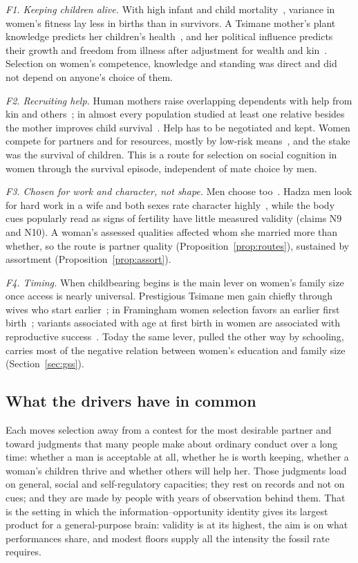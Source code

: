 \emph{F1. Keeping children alive.} With high infant and child mortality~\cite{volk2013}, variance in women's fitness lay less in
births than in survivors. A Tsimane mother's plant knowledge predicts her children's health~\cite{mcdade2007}, and her political
influence predicts their growth and freedom from illness after adjustment for wealth and kin~\cite{alami2020}. Selection on
women's competence, knowledge and standing was direct and did not depend on anyone's choice of them.

\emph{F2. Recruiting help.} Human mothers raise overlapping dependents with help from kin and
others~\cite{kramer2010,hawkes1998,burkart2014}; in almost every population studied at least one relative besides the mother
improves child survival~\cite{sear2008}. Help has to be negotiated and kept. Women compete for partners and for resources, mostly by
low-risk means~\cite{stockley2013}, and the stake was the survival of children. This is a route for selection on social
cognition in women through the survival episode, independent of mate choice by men.

\emph{F3. Chosen for work and character, not shape.} Men choose too~\cite{stewartwilliams2013}. Hadza men look for hard work in a
wife and both sexes rate character highly~\cite{marlowe2004}, while the body cues popularly read as signs of fertility have
little measured validity (claims N9 and N10). A woman's assessed qualities affected whom she married more than whether, so the
route is partner quality (Proposition~\ref{prop:routes}), sustained by assortment (Proposition~\ref{prop:assort}).

\emph{F4. Timing.} When childbearing begins is the main lever on women's family size once access is nearly universal.
Prestigious Tsimane men gain chiefly through wives who start earlier~\cite{vonrueden2011}; in Framingham women selection favors an
earlier first birth~\cite{byars2010}; variants associated with age at first birth in women are associated with reproductive
success~\cite{sanjak2018}. Today the same lever, pulled the other way by schooling, carries most of the negative relation between
women's education and family size (Section~\ref{sec:gss}).

\subsection{What the drivers have in common}

Each moves selection away from a contest for the most desirable partner and toward judgments that many people make about
ordinary conduct over a long time: whether a man is acceptable at all, whether he is worth keeping, whether a woman's children
thrive and whether others will help her. Those judgments load on general, social and self-regulatory capacities; they rest
on records and not on cues; and they are made by people with years of observation behind them. That is the setting in which
the information--opportunity identity gives its largest product for a general-purpose brain: validity is at its highest,
the aim is on what performances share, and modest floors supply all the intensity the fossil rate requires.
